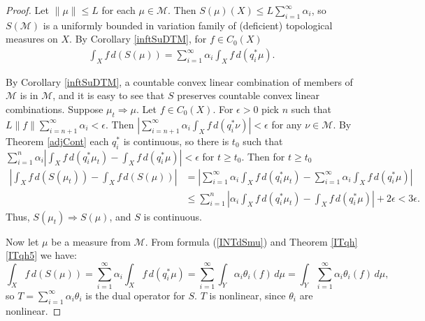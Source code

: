 \documentclass[sn-mathphys-num]{sn-jnl}%
\theoremstyle{thmstyleone}%
\theoremstyle{definition}
\begin{document}
\begin{proof}
Let  $ \| \mu \|  \le L$ for each $ \mu \in \mathcal{M}$. Then $S(\mu)(X) \le L  \sum_{i=1}^\infty \alpha_i $, 
so $S(\mathcal{M})$ is a uniformly bounded in variation family of (deficient) topological measures on $X$.
By Corollary \ref{inftSuDTM}, for $ f \in C_0(X)$ 
\begin{align} \label{INTdSmu}
 \int_X f \, d(S(\mu)) = \sum_{i=1}^\infty \alpha_i \int_X f \, d(q_i^* \mu).
\end{align}

By Corollary \ref{inftSuDTM},  a countable convex linear combination of members of $\mathcal{M}$ is in $\mathcal{M}$, 
and it is easy to see that $S$ preserves countable convex linear combinations. 
Suppose $ \mu_t \Longrightarrow \mu$. 
Let $ f \in C_0(X)$. For $ \epsilon >0$ pick $n$ such that 
$ L \| f \| \sum_{i=n+1}^{\infty} \alpha_i  < \epsilon$. 
Then $| \sum_{i=n+1}^\infty \alpha_i \int_X f \, d(q_i^* \nu)| < \epsilon$ for any $ \nu \in  \mathcal{M} $.
By Theorem \ref{adjCont} each  $q_i^*$ is continuous, so there is $ t_0$ such that 
$ \sum_{i=1}^n \alpha_i  |  \int_X f \, d(q_i^* \mu_t) -  \int_X f \, d(q_i^* \mu) | < \epsilon$ for $ t \ge t_0$.
Then for  $ t \ge t_0$
\begin{align*}
| \int_X f \, d(S(\mu_t)) -  \int_X f \, d(S(\mu)) | &= 
|\sum_{i=1}^{\infty} \alpha_i \int_X f \, d(q_i^*\mu_t) -  \sum_{i=1}^{\infty} \alpha_i \int_X f \, d(q_i^*\mu) | \\
& \le   \sum_{i=1}^n |  \alpha_i   \int_X f \, d(q_i^* \mu_t) -  \int_X f \, d(q_i^* \mu) | + 2 \epsilon < 3 \epsilon. 
\end{align*}
Thus,  $S( \mu_t) \Longrightarrow  S(\mu)$, and $S$ is continuous. 

Now let $ \mu$ be a measure from $\mathcal{M}$.
From formula (\ref{INTdSmu}) and Theorem \ref{ITqh}\ref{ITqh5} we have:
$$ \int_X f \, d(S(\mu)) = \sum_{i=1}^\infty \alpha_i \int_X f \, d(q_i^* \mu) =  \sum_{i=1}^\infty \int_Y  \alpha_i  \theta_i(f) \,  d\mu 
= \int_Y  \sum_{i=1}^\infty  \alpha_i  \theta_i(f) \,  d\mu,$$
so $ T= \sum_{i=1}^\infty \alpha_i \theta_i$ is the dual operator for $S$. $T$ is nonlinear, since $\theta_i$ are nonlinear. 
\end{proof}
\end{document}
